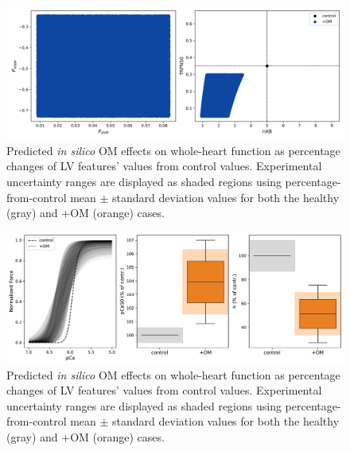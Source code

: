 \begin{figure}[!ht]
    \myfloatalign
    \includegraphics[width=\textwidth]{figures/chapter05/Deltas_and_params_with_OM_blue.png}
    \caption{Predicted \textit{in silico} OM effects on whole-heart function as percentage changes of LV features' values from control values. Experimental uncertainty ranges are displayed as shaded regions using percentage-from-control mean $\pm$ standard deviation values for both the healthy (gray) and $+$OM (orange) cases.}
    \label{fig:deltas}
\end{figure}

\begin{figure}[!ht]
    \myfloatalign
    \includegraphics[width=\textwidth]{figures/chapter05/Fig3_mod.pdf}
    \caption{Predicted \textit{in silico} OM effects on whole-heart function as percentage changes of LV features' values from control values. Experimental uncertainty ranges are displayed as shaded regions using percentage-from-control mean $\pm$ standard deviation values for both the healthy (gray) and $+$OM (orange) cases.}
    \label{fig:lvfeatsdistrmod}
\end{figure}

